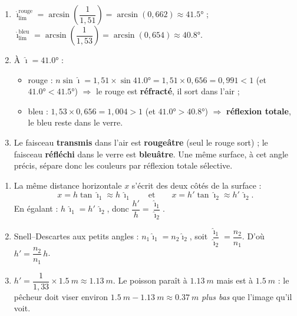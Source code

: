 \documentclass[11pt,a4paper]{article}
\begin{document}
\begin{corrige}
\begin{enumerate}[label=\alph*)]
  \item $\hat{\imath}_{\text{lim}}^{\text{rouge}}=\arcsin\!\left(\dfrac{1}{1{,}51}\right)=\arcsin(0{,}662)\approx\ang{41.5}$ ;
        $\hat{\imath}_{\text{lim}}^{\text{bleu}}=\arcsin\!\left(\dfrac{1}{1{,}53}\right)=\arcsin(0{,}654)\approx\ang{40.8}$.
  \item À $\hat{\imath}=\ang{41.0}$ :
        \begin{itemize}[leftmargin=1.5em,topsep=1pt]
          \item rouge : $n\sin\hat{\imath}=1{,}51\times\sin\ang{41.0}=1{,}51\times0{,}656=0{,}991<1$
                (et $\ang{41.0}<\ang{41.5}$) $\Rightarrow$ le rouge est \textbf{réfracté}, il sort dans l'air ;
          \item bleu : $1{,}53\times0{,}656=1{,}004>1$ (et $\ang{41.0}>\ang{40.8}$) $\Rightarrow$
                \textbf{réflexion totale}, le bleu reste dans le verre.
        \end{itemize}
  \item Le faisceau \textbf{transmis} dans l'air est \textbf{rougeâtre} (seul le rouge sort) ; le
        faisceau \textbf{réfléchi} dans le verre est \textbf{bleuâtre}. Une même surface, à cet angle
        précis, sépare donc les couleurs par réflexion totale sélective.
\end{enumerate}
\end{corrige}

\begin{corrige}
\begin{enumerate}[label=\alph*)]
  \item La même distance horizontale $x$ s'écrit des deux côtés de la surface :
        \[ x=h\tan\hat{\imath}_1\approx h\,\hat{\imath}_1
           \qquad\text{et}\qquad x=h'\tan\hat{\imath}_2\approx h'\,\hat{\imath}_2. \]
        En égalant : $h\,\hat{\imath}_1=h'\,\hat{\imath}_2$, donc
        $\dfrac{h'}{h}=\dfrac{\hat{\imath}_1}{\hat{\imath}_2}$.
  \item Snell–Descartes aux petits angles : $n_1\hat{\imath}_1=n_2\hat{\imath}_2$, soit
        $\dfrac{\hat{\imath}_1}{\hat{\imath}_2}=\dfrac{n_2}{n_1}$. D'où
        $\boxed{h'=\dfrac{n_2}{n_1}\,h}$.
  \item $h'=\dfrac{1}{1{,}33}\times\qty{1.5}{m}\approx\qty{1.13}{m}$. Le poisson paraît à
        $\qty{1.13}{m}$ mais est à $\qty{1.5}{m}$ : le pêcheur doit viser environ
        $\qty{1.5}{m}-\qty{1.13}{m}\approx\qty{0.37}{m}$ \emph{plus bas} que l'image qu'il voit.
\end{enumerate}
\end{corrige}
\end{document}
